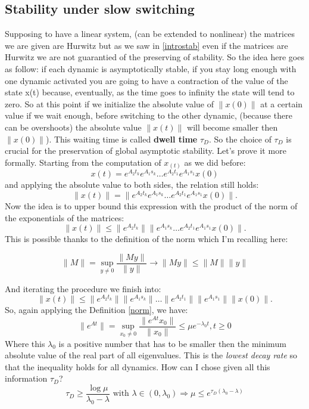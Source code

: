 \subsection{Stability under slow switching}
Supposing to have a linear system, (can be extended to nonlinear) the matrices we are given are Hurwitz but as we saw in \ref{introstab} even if the matrices are Hurwitz we are not guarantied of the preserving of stability. So the idea here goes as follow: if each dynamic is asymptotically stable, if you stay long enough with one dynamic activated you are going to have a contraction of the value of the state x(t) because, eventually, as the time goes to infinity the state will tend to zero. So at this point if we initialize the absolute value of $\left\|x(0)\right\|$ at a certain value if we wait enough, before switching to the other dynamic, (because there can be overshoots) the absolute value $\left\|x(t)\right\|$ will become smaller then $\left\|x(0)\right\|$). This waiting time is called \textbf{dwell time} $\tau_D$. So the choice of $\tau_D$ is crucial for the preservation of global asymptotic stability. Let's prove it more formally.
Starting from the computation of $x_(t)$ as we did before:
\[x(t)=e^{A_2t_k}e^{A_1s_k}\dots e^{A_2t_1}e^{A_1s_1}x(0)\]
and applying the absolute value to both sides, the relation still holds:
\[\|x(t)\|=\|e^{A_2t_k}e^{A_1s_k}\dots e^{A_2t_1}e^{A_1s_1}x(0)\|.\]
Now the idea is to upper bound this expression with the product of the norm of the exponentials of the matrices:
\[\|x(t)\| \le \| e^{A_2t_k}\| \|e^{A_1s_k}\dots e^{A_2t_1}e^{A_1s_1}x(0)\|.\]
This is possible thanks to the definition of the norm which I'm recalling here:
\begin{defn}[Norm] \label{norm}
	\[\|M\| = \sup_{y \neq0}\frac{\|My\|}{\|y\|}\to \|My\| \le \|M\|\|y\|
	\]
\end{defn}
And iterating the procedure we finish into:
\[\|x(t)\| \le \| e^{A_2t_k}\| \|e^{A_1s_k}\|\dots \|e^{A_2t_1}\|\|e^{A_1s_1}\|\|x(0)\|.\]
So, again applying the Definition \ref{norm}, we have:
\begin{equation}\label{eq1}
	\|e^{At}\|=\sup_{x_0 \neq0}\frac{\|e^{At}x_0\|}{\|x_0\|}\le \mu e^{-\lambda_0t},t \ge 0
\end{equation}
Where this $\lambda_0$ is a positive number that has to be smaller then the minimum absolute value of the real part of all eigenvalues. This is the \emph{lowest decay rate} so that the inequality holds for all dynamics.
How can I chose given all this information $\tau_D$? 
\begin{equation} \label{eq2}
	\tau_D \ge \frac{\log\mu}{\lambda_0-\lambda} \text{ with } \lambda\in(0,\lambda_0)\Longrightarrow \mu \le e^{\tau_D(\lambda_0-\lambda)}
\end{equation}

